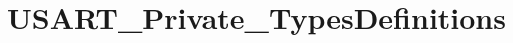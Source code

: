 \hypertarget{group___u_s_a_r_t___private___types_definitions}{\section{U\-S\-A\-R\-T\-\_\-\-Private\-\_\-\-Types\-Definitions}
\label{group___u_s_a_r_t___private___types_definitions}
}
